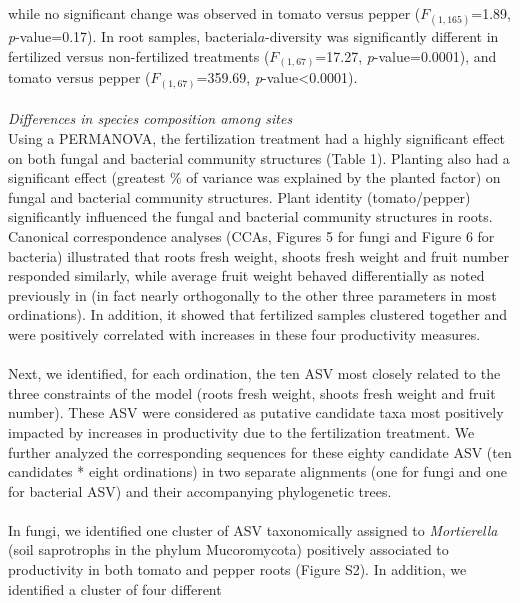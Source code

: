 \documentclass[12pt,]{article}
\begin{document}
while no significant change was observed in tomato versus pepper
(\(F_{(1,165)}\)=1.89, \emph{p}-value=0.17). In root samples,
bacterial\(a\)-diversity was significantly different in fertilized
versus non-fertilized treatments (\(F_{(1,67)}\)=17.27,
\emph{p}-value=0.0001), and tomato versus pepper (\(F_{(1,67)}\)=359.69,
\emph{p}-value\textless{}0.0001).\\
\hspace*{0.333em}\\
\emph{Differences in species composition among sites}\\
Using a PERMANOVA, the fertilization treatment had a highly significant
effect on both fungal and bacterial community structures (Table 1).
Planting also had a significant effect (greatest \% of variance was
explained by the planted factor) on fungal and bacterial community
structures. Plant identity (tomato/pepper) significantly influenced the
fungal and bacterial community structures in roots. ~\\
Canonical correspondence analyses (CCAs, Figures 5 for fungi and Figure
6 for bacteria) illustrated that roots fresh weight, shoots fresh weight
and fruit number responded similarly, while average fruit weight behaved
differentially as noted previously in (in fact nearly orthogonally to
the other three parameters in most ordinations). In addition, it showed
that fertilized samples clustered together and were positively
correlated with increases in these four productivity measures.\\
\hspace*{0.333em}\\
Next, we identified, for each ordination, the ten ASV most closely
related to the three constraints of the model (roots fresh weight,
shoots fresh weight and fruit number). These ASV were considered as
putative candidate taxa most positively impacted by increases in
productivity due to the fertilization treatment. We further analyzed the
corresponding sequences for these eighty candidate ASV (ten candidates *
eight ordinations) in two separate alignments (one for fungi and one for
bacterial ASV) and their accompanying phylogenetic trees.\\
\hspace*{0.333em}\\
In fungi, we identified one cluster of ASV taxonomically assigned to
\emph{Mortierella} (soil saprotrophs in the phylum Mucoromycota)
positively associated to productivity in both tomato and pepper roots
(Figure S2). In addition, we identified a cluster of four different
\end{document}

